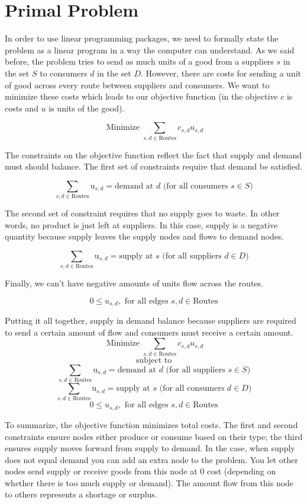 \documentclass{report}
\begin{document}
\section{Primal Problem}

In order to use linear programming packages, we need to formally state the problem as a linear program in a way the computer can understand. As we said before, the problem tries to send as much units of a good from a suppliers $s$ in the set $S$ to consumers $d$ in the set $D$. However, there are costs for sending a unit of good across every route between suppliers and consumers. We want to minimize these costs which leads to our objective function (in the objective $c$ is costs and $u$ is units of the good). 

$$\operatorname{Minimize} \sum_{s,d \in \text{Routes}} c_{s,d} u_{s,d}$$

The constraints on the objective function reflect the fact that supply and demand must should balance. The first set of constraints require that demand be satisfied.

$$\sum_{s,d \in \text{Routes}} \text{u}_{s,d}= \text{demand at } d \text{ (for all consumers } s \in S)$$

The second set of constraint requires that no supply goes to waste. In other words, no product is just left at suppliers. In this case, supply is a negative quantity because supply leaves the supply nodes and flows to demand nodes.

$$\sum_{s,d \in \text{Routes}} \text{u}_{s,d}= \text{supply at } s \text{ (for all suppliers } d \in D)$$

Finally, we can't have negative amounts of units flow across the routes.

$$0 \leq u_{s,d},  \text{ for all edges } s,d \in \text{Routes}$$

Putting it all together, supply in demand balance because suppliers are required to send a certain amount of flow and consumers must receive a certain amount.
$$\operatorname{Minimize} \sum_{s,d \in \text{Routes}} c_{s,d} u_{s,d}$$
$$\text{subject to}$$
$$\sum_{s,d \in \text{Routes}} \text{u}_{s,d}= \text{demand at } d \text{ (for all suppliers } s \in S)$$
$$\sum_{s,d \in \text{Routes}} \text{u}_{s,d}= \text{supply at } s \text{ (for all consumers } d \in D)$$
$$0 \leq u_{s,d}, \text{ for all edges } s,d \in \text{Routes}$$

To summarize, the objective function minimizes total costs. The first and second constraints ensure nodes either produce or consume based on their type; the third ensures supply moves forward from supply to demand.  In the case, when supply does not equal demand you can add an extra node to the problem. You let other nodes send supply or receive goods from this node at 0 cost (depending on whether there is too much supply or demand). The amount flow from this node to others represents a shortage or surplus.
\end{document}
